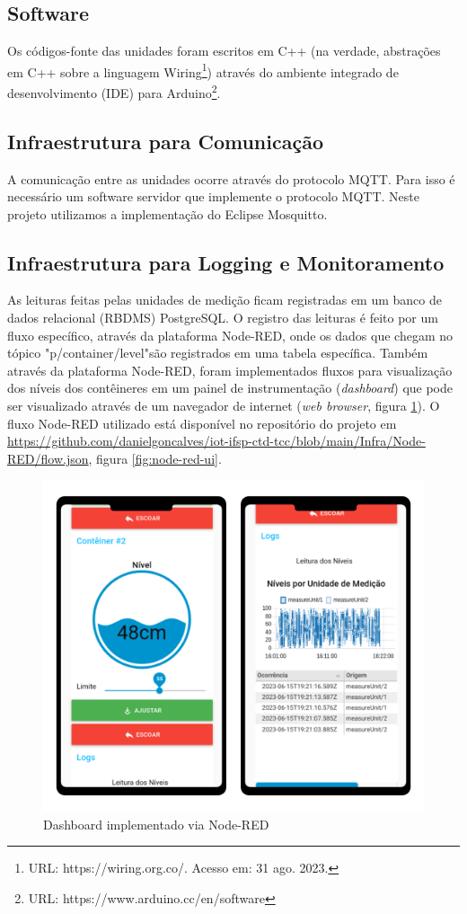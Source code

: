 \subsection{Software}
Os códigos-fonte das unidades foram escritos em C++ (na verdade, abstrações em C++ sobre a linguagem Wiring\footnote{URL: https://wiring.org.co/. Acesso em: 31 ago. 2023.}) através do ambiente integrado de desenvolvimento (IDE) para Arduino\footnote{URL: https://www.arduino.cc/en/software}. 

\subsection{Infraestrutura para Comunicação}
A comunicação entre as unidades ocorre através do protocolo MQTT. Para isso é necessário um software servidor que implemente o protocolo MQTT. Neste projeto utilizamos a implementação do Eclipse Mosquitto. 

\subsection{Infraestrutura para Logging e Monitoramento}
As leituras feitas pelas unidades de medição ficam registradas em um banco de dados relacional (RBDMS) PostgreSQL. O registro das leituras é feito por um fluxo específico, através da plataforma Node-RED, onde os dados que chegam no tópico "p/container/level"\space são registrados em uma tabela específica.
Também através da plataforma Node-RED, foram implementados fluxos para visualização dos níveis dos contêineres em um painel de instrumentação (\textit{dashboard}) que pode ser visualizado através de um navegador de internet (\textit{web browser}, figura \ref{fig:dashboard-node-red}). O fluxo Node-RED utilizado está disponível no repositório do projeto em \url{https://github.com/danielgoncalves/iot-ifsp-ctd-tcc/blob/main/Infra/Node-RED/flow.json}, figura \ref{fig:node-red-ui}.

\begin{figure}[h!]
    \centering
    \includegraphics[width=12cm]{imagem/dashboard-mobile.png}
    \caption{Dashboard implementado via Node-RED}
    \label{fig:dashboard-node-red}
\end{figure}

